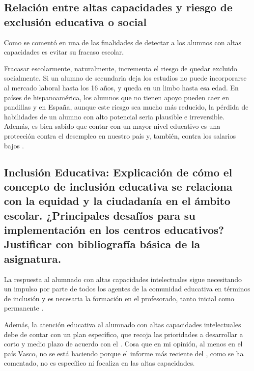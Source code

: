 \documentclass[12pt, a4paper]{article}
\begin{document}
	
	\subsection{Relación entre altas capacidades y riesgo de exclusión educativa o social}
	
	Como se comentó en \textcite[10--11]{Arocas2002OrientPsicopedGVA} una de las finalidades de detectar a los alumnos con altas capacidades es evitar su fracaso escolar.
	
	Fracasar escolarmente, naturalmente, incrementa el riesgo de quedar excluido socialmente. Si un alumno de secundaria deja los estudios no puede incorporarse al mercado laboral hasta los 16 años, y queda en un limbo hasta esa edad. En países de hispanoamérica, los alumnos que no tienen apoyo pueden caer en pandillas y en España, aunque este riesgo sea mucho más reducido, la pérdida de habilidades de un alumno con alto potencial seria plausible e irreversible. Además, es bien sabido que contar con un mayor nivel educativo es una protección contra el desempleo en nuestro país y, también, contra los salarios bajos \parencite{bbvaSalarioEstudios}.
	

	
	
	
	
	
	
	\subsection{Inclusión Educativa: Explicación de cómo el concepto de inclusión educativa se relaciona con la equidad y la ciudadanía en el ámbito escolar. ¿Principales desafíos para su implementación en los centros educativos? Justificar con bibliografía básica de la asignatura.}
	
	
	La respuesta al alumnado con altas capacidades intelectuales sigue necesitando un impulso por parte de todos los agentes de la comunidad educativa en términos de inclusión y es necesaria la formación en el profesorado, tanto inicial como permanente \parencite[9]{gobiernoVascoPlanAACC2019_recomanatUned}.
	
	Además, la atención educativa al alumnado con altas capacidades intelectuales debe de contar con un
	plan específico, que recoja las prioridades a desarrollar a corto y medio plazo de acuerdo con el \textcite[10]{gobiernoVascoPlanAACC2019_recomanatUned}. Cosa que en mi opinión, al menos en el país Vasco, \underline{no se está haciendo} porque el informe más reciente del \textcite{gobiernoVascoEstrategia2024}, como se ha comentado, no es específico ni focaliza en las altas capacidades.
\end{document}
